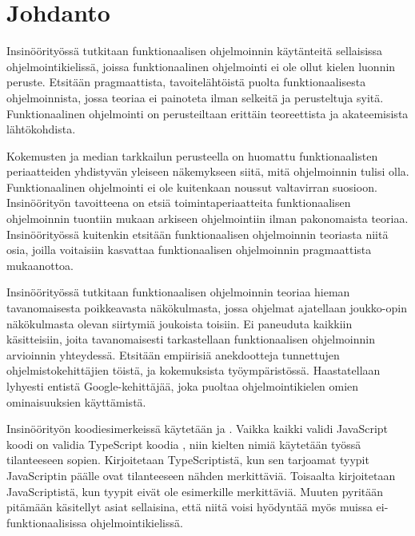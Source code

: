 
\chapter{Johdanto}


Insinöörityössä tutkitaan funktionaalisen ohjelmoinnin käytänteitä sellaisissa ohjelmointikielissä, joissa funktionaalinen ohjelmointi ei ole ollut kielen luonnin peruste. Etsitään pragmaattista, tavoitelähtöistä puolta funktionaalisesta ohjelmoinnista, jossa teoriaa ei painoteta ilman selkeitä ja perusteltuja syitä. Funktionaalinen ohjelmointi on perusteiltaan erittäin teoreettista ja akateemisista lähtökohdista.

Kokemusten ja median tarkkailun perusteella on huomattu funktionaalisten periaatteiden yhdistyvän yleiseen näkemykseen siitä, mitä ohjelmoinnin tulisi olla. Funktionaalinen ohjelmointi ei ole kuitenkaan noussut valtavirran suosioon. Insinöörityön tavoitteena on etsiä toimintaperiaatteita funktionaalisen ohjelmoinnin tuontiin mukaan arkiseen ohjelmointiin ilman pakonomaista teoriaa. Insinöörityössä kuitenkin etsitään funktionaalisen ohjelmoinnin teoriasta niitä osia, joilla voitaisiin kasvattaa funktionaalisen ohjelmoinnin pragmaattista mukaanottoa.

Insinöörityössä tutkitaan funktionaalisen ohjelmoinnin teoriaa hieman tavanomaisesta poikkeavasta näkökulmasta, jossa ohjelmat ajatellaan joukko-opin näkökulmasta olevan siirtymiä joukoista toisiin. Ei paneuduta kaikkiin käsitteisiin, joita tavanomaisesti tarkastellaan funktionaalisen ohjelmoinnin arvioinnin yhteydessä. Etsitään empiirisiä anekdootteja tunnettujen ohjelmistokehittäjien töistä, ja kokemuksista työympäristössä. Haastatellaan lyhyesti entistä Google-kehittäjää, joka puoltaa ohjelmointikielen omien ominaisuuksien käyttämistä.


Insinöörityön koodiesimerkeissä käytetään  ja . Vaikka kaikki validi JavaScript koodi on validia TypeScript koodia \cite{typsecript_website}, niin kielten nimiä käytetään työssä tilanteeseen sopien. Kirjoitetaan TypeScriptistä, kun sen tarjoamat tyypit JavaScriptin päälle ovat tilanteeseen nähden merkittäviä. Toisaalta kirjoitetaan JavaScriptistä, kun tyypit eivät ole esimerkille merkittäviä. Muuten pyritään pitämään käsitellyt asiat sellaisina, että niitä voisi hyödyntää myös muissa ei-funktionaalisissa ohjelmointikielissä.